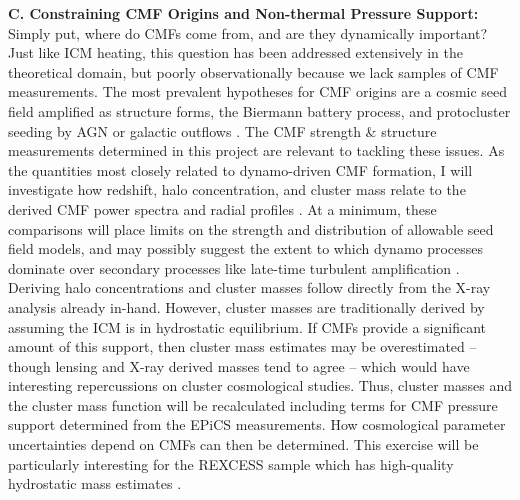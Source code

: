 \documentclass[letterpaper,12pt]{article}
\begin{document}
{\bf{C. Constraining CMF Origins and Non-thermal Pressure Support:}}
Simply put, where do CMFs come from, and are they dynamically
important? Just like ICM heating, this question has been addressed
extensively in the theoretical domain, but poorly observationally
because we lack samples of CMF measurements. The most prevalent
hypotheses for CMF origins are a cosmic seed field amplified as
structure forms, the Biermann battery process, and protocluster
seeding by AGN or galactic outflows \citep{2002ARA&A..40..319C}. The
CMF strength \& structure measurements determined in this project are
relevant to tackling these issues. As the quantities most closely
related to dynamo-driven CMF formation, I will investigate how
redshift, halo concentration, and cluster mass relate to the derived
CMF power spectra and radial profiles \citep{2009MNRAS.392.1008D}. At
a minimum, these comparisons will place limits on the strength and
distribution of allowable seed field models, and may possibly suggest
the extent to which dynamo processes dominate over secondary processes
like late-time turbulent amplification
\citep{2002A&A...387..383D}. Deriving halo concentrations and cluster
masses follow directly from the X-ray analysis already
in-hand. However, cluster masses are traditionally derived by assuming
the ICM is in hydrostatic equilibrium. If CMFs provide a significant
amount of this support, then cluster mass estimates may be
overestimated -- though lensing and X-ray derived masses tend to agree
-- which would have interesting repercussions on cluster cosmological
studies. Thus, cluster masses and the cluster mass function will be
recalculated \citep[\eg][]{2009ApJ...692.1060V} including terms for
CMF pressure support determined from the EPiCS measurements. How
cosmological parameter uncertainties depend on CMFs can then be
determined. This exercise will be particularly interesting for the
REXCESS sample which has high-quality hydrostatic mass estimates
\citep{2010A&A...517A..92A}.
\end{document}
